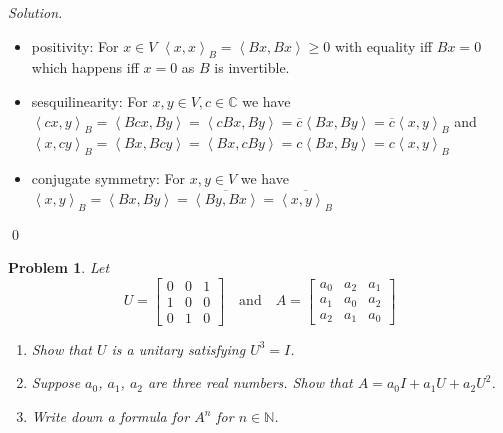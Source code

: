 \documentclass[12pt,a4paper]{article}
\newenvironment{solution}{%
  \par\noindent\textit{Solution.}\ }{\qed}
\theoremstyle{problemstyle}
\newtheorem{problem}{Problem}[section]
\def\bC{\mathbb{C}}
\newcommand{\ipp}[1]{{\left\langle{#1}\right\rangle}}
\begin{document}
\begin{solution}
	\begin{itemize}
		\item positivity: For $x\in V$ $\ipp{x,x}_B=\ipp{Bx,Bx}\geq 0$ with equality iff $Bx=0$ which happens iff $x=0$ as $B$ is invertible.
		\item sesquilinearity: For $x,y\in V,c\in\bC$ we have $\ipp{cx,y}_B=\ipp{Bcx,By}=\ipp{cBx,By}=\overline{c}\ipp{Bx,By}=\overline{c}\ipp{x,y}_B$ and $\ipp{x,cy}_B=\ipp{Bx,Bcy}=\ipp{Bx,cBy}=c\ipp{Bx,By}=c\ipp{x,y}_B$
		\item conjugate symmetry: For $x,y\in V$ we have $\ipp{x,y}_B=\ipp{Bx,By}=\overline{\ipp{By,Bx}}=\overline{\ipp{x,y}_B}$
	\end{itemize}
\end{solution}
\begin{problem}\label{prob:2-3}
Let
$$U=\begin{bmatrix}0&0&1\\ 1&0&0\\ 0&1&0\end{bmatrix} \quad \text{and} \quad A=\begin{bmatrix}a_{0}&a_{2}&a_{1}\\ a_{1}&a_{0}&a_{2}\\ a_{2}&a_{1}&a_{0}\end{bmatrix}$$
\begin{enumerate}
    \item[(i)] Show that $U$ is a unitary satisfying $U^{3}=I$.
    \item[(ii)] Suppose $a_{0}$, $a_{1}$, $a_{2}$ are three real numbers. Show that $A=a_{0}I+a_{1}U+a_{2}U^{2}$.
    \item[(iii)] Write down a formula for $A^{n}$ for $n\in\mathbb{N}$.
\end{enumerate}
\end{problem}
\end{document}
